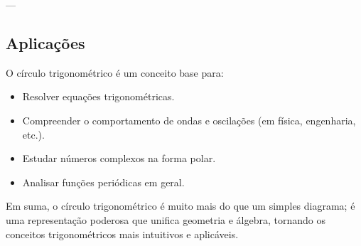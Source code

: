 \documentclass{article}
\begin{document}
---

\subsection*{Aplicações}

O círculo trigonométrico é um conceito base para:

\begin{itemize}
    \item Resolver equações trigonométricas.
    \item Compreender o comportamento de ondas e oscilações (em física, engenharia, etc.).
    \item Estudar números complexos na forma polar.
    \item Analisar funções periódicas em geral.
\end{itemize}

Em suma, o círculo trigonométrico é muito mais do que um simples diagrama; é uma representação poderosa que unifica geometria e álgebra, tornando os conceitos trigonométricos mais intuitivos e aplicáveis.
\end{document}
